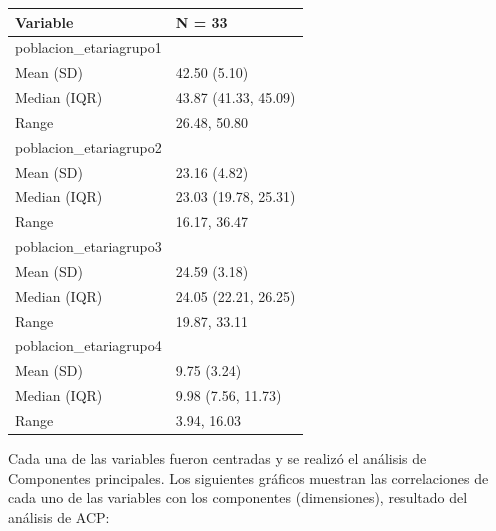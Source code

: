 \begin{table}
\centering\begingroup\fontsize{7}{9}\selectfont

\begin{tabular}{ll}
\toprule
Variable & N = 33\\
\midrule
poblacion\_etariagrupo1 & \\
\hspace{1em}Mean (SD) & 42.50 (5.10)\\
\hspace{1em}Median (IQR) & 43.87 (41.33, 45.09)\\
\hspace{1em}Range & 26.48, 50.80\\
poblacion\_etariagrupo2 & \\
\addlinespace
\hspace{1em}Mean (SD) & 23.16 (4.82)\\
\hspace{1em}Median (IQR) & 23.03 (19.78, 25.31)\\
\hspace{1em}Range & 16.17, 36.47\\
poblacion\_etariagrupo3 & \\
\hspace{1em}Mean (SD) & 24.59 (3.18)\\
\addlinespace
\hspace{1em}Median (IQR) & 24.05 (22.21, 26.25)\\
\hspace{1em}Range & 19.87, 33.11\\
poblacion\_etariagrupo4 & \\
\hspace{1em}Mean (SD) & 9.75 (3.24)\\
\hspace{1em}Median (IQR) & 9.98 (7.56, 11.73)\\
\addlinespace
\hspace{1em}Range & 3.94, 16.03\\
\bottomrule
\end{tabular}
\endgroup{}
\end{table}

Cada una de las variables fueron centradas y se realizó el análisis de
Componentes principales. Los siguientes gráficos muestran las
correlaciones de cada uno de las variables con los componentes
(dimensiones), resultado del análisis de ACP:

